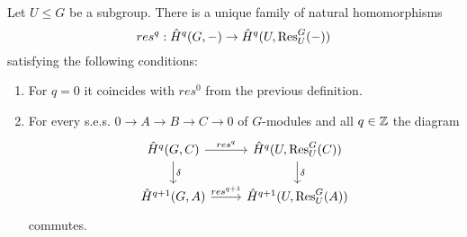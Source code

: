\documentclass[fontsize=11pt,fleqn,a4paper]{scrartcl}
\begin{document}
\begin{theoremdef}
Let $U\leq G$ be a subgroup. There is a unique family of natural homomorphisms
\[res^q: \hat{H}^q(G,-) \to \hat{H}^q(U,\operatorname{Res}_U^G(-))\]
satisfying the following conditions:
\begin{enumerate}
\item For $q=0$ it coincides with $res^0$ from the previous definition.
\item For every s.e.s. $0\to A \to B\to C \to 0$ of $G$-modules and all $q\in\mathbb{Z}$ the diagram
\[\begin{tikzcd}
\hat{H}^q(G,C) \arrow[r,"res^q"] \arrow[d,"\delta"] & \hat{H}^q(U,\Res_U^G(C)) \arrow[d,"\delta"] \\
\hat{H}^{q+1}(G,A) \arrow[r,"res^{q+1}"] & \hat{H}^{q+1}(U,\Res_U^G(A))
\end{tikzcd}\]
commutes.
\end{enumerate}
\end{theoremdef}
\end{document}
